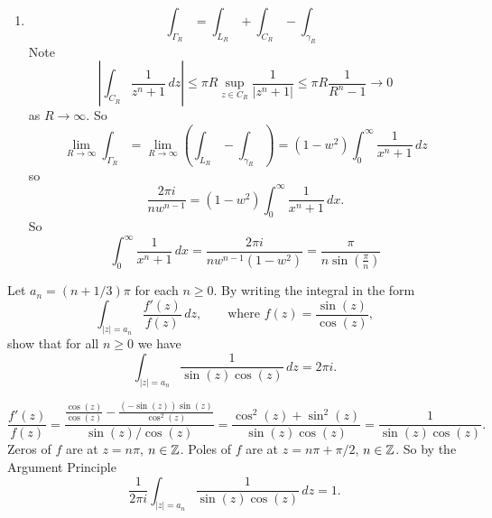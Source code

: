 \documentclass[10pt, a4paper]{article}
\begin{document}
\begin{problem}
\begin{solution}
\begin{enumerate}[label = (\roman*)]
            \item
            \[
            \int_{\Gamma_R} = \int_{L_R} + \int_{C_R} - \int_{\gamma_R}
            \]
            Note
            \[
            |\int_{C_R}\frac{1}{z ^ n + 1}\,dz| \leq \pi R\sup_{z \in C_R}\frac{1}{|z ^ n + 1|} \leq \pi R\frac{1}{R ^ n - 1} \to 0
            \]
            as $R \to \infty$.
            So
            \[
            \lim_{R \to \infty}\int_{\Gamma_R} = \lim_{R \to \infty}\left(\int_{L_R} - \int_{\gamma_R}\right) = (1 - w ^ 2)\int_{0}^{\infty}\frac{1}{x ^ n + 1}\,dz
            \]
            so
            \[
            \frac{2\pi i}{nw ^ {n - 1}} = (1 - w ^ 2)\int_{0}^{\infty}\frac{1}{x ^ n + 1}\,dx.
            \]
            So
            \[
            \int_{0}^{\infty}\frac{1}{x ^ n + 1}\,dx = \frac{2\pi i}{nw ^ {n - 1}(1 - w ^ 2)} = \frac{\pi}{n\sin\left(\frac{\pi}{n}\right)}
            \]
        \end{enumerate}
    \end{solution}
\end{problem}

\begin{problem}
    Let $a_n = (n + 1 / 3)\pi$ for each $n \geq 0$.
    By writing the integral in the form
    \[
    \int_{|z| = a_n}\frac{f'(z)}{f(z)}\,dz,\qquad\text{where } f(z) = \frac{\sin(z)}{\cos(z)},
    \]
    show that for all $n \geq 0$ we have
    \[
    \int_{|z| = a_n}\frac{1}{\sin(z)\cos(z)}\,dz = 2\pi i.
    \]

    \begin{solution}
        \[
        \frac{f'(z)}{f(z)} = \frac{\frac{\cos(z)}{\cos(z)} - \frac{(-\sin(z))\sin(z)}{\cos ^ 2(z)}}{\sin(z) / \cos(z)} = \frac{\cos ^ 2(z) + \sin ^ 2(z)}{\sin(z)\cos(z)} = \frac{1}{\sin(z)\cos(z)}.
        \]
        Zeros of $f$ are at $z = n\pi$,
        $n \in \mathbb{Z}$.
        Poles of $f$ are at $z = n\pi + \pi / 2$,
        $n \in \mathbb{Z}$.
        So by the Argument Principle
        \[
        \frac{1}{2\pi i}\int_{|z| = a_n}\frac{1}{\sin(z)\cos(z)}\,dz = 1.
        \]
    \end{solution}
\end{problem}
\end{document}

